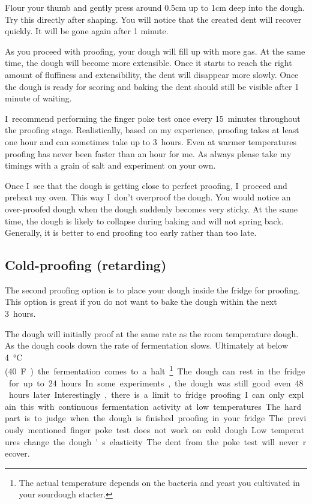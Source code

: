 Flour your thumb and gently press around 0.5cm up to 1cm deep into the dough.
Try this directly after shaping. You will notice that the created dent will
recover quickly. It will be gone again after 1 minute.

As you proceed with proofing, your dough will fill up with more gas. At the
same time, the dough will become more extensible. Once it starts to reach the
right amount of fluffiness and extensibility, the dent will disappear more slowly.
Once the dough is ready for scoring and baking the dent should still be visible after
1 minute of waiting.

I~recommend performing the finger poke test once every 15~minutes throughout
the proofing stage. Realistically, based on my experience, proofing takes at least
one hour and can sometimes take up to 3~hours. Even at warmer temperatures proofing
has never been faster than an hour for me. As always please take my timings with
a grain of salt and experiment on your own.

Once I~see that the dough is getting close to perfect proofing, I~proceed and
preheat my oven. This way I~don't overproof the dough. You would notice an
over-proofed dough when the dough suddenly becomes very sticky. At the same
time, the dough is likely to collapse during baking and will not spring back.
Generally, it is better to end proofing too early rather than too late.

\subsection{Cold-proofing (retarding)}

The second proofing option is to place your dough inside the fridge for
proofing. This option is great if you do not want to bake the dough
within the next 3~hours.

The dough will initially proof at the same rate as the room temperature dough.
As the dough cools down the rate of fermentation slows. Ultimately at below
\qty{4}{\degreeCelsius} (\qty{40}F) the fermentation comes to a halt\footnote{The actual temperature
depends on the bacteria and yeast you cultivated in your sourdough
starter.}. The dough can rest in the fridge for up to 24~hours. In some
experiments, the dough was still good even 48~hours later. Interestingly,
there is a limit to fridge proofing. I~can only explain this with continuous
fermentation activity at low temperatures.

The hard part is to judge when the dough is finished proofing in your fridge.
The previously mentioned finger poke test does not work on cold dough. Low
temperatures change the dough's elasticity. The dent from the poke test
will never recover.

